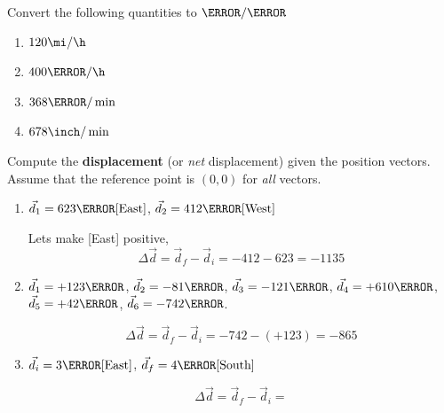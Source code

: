 \documentclass[12pt]{article} %
\newcommand{\tx}[1]{\text{#1}}
\begin{document}
\begin{qstn}[2] %
	Convert the following quantities to $\m / \s$
	\begin{enumerate}[label = (\alph*)]
		\item $120 \mi / \h$
		\vspace*{4cm}

		\item $400 \km / \h$
		\vspace*{4cm}
		
		\item $368 \m / \min$
		\vspace*{4cm}

		\item $678 \inch / \min$
		\vspace*{4cm}

	\end{enumerate}

\end{qstn}


\begin{qstn}[3]
	Compute the \textbf{displacement} (or \emph{net} displacement) given the position vectors. Assume that the reference point is $(0,0)$ for \emph{all} vectors.
    \begin{enumerate}[label=(\alph*)]
        \item $\vec d_1 = 623 \tx{\m}[\tx{East}]$, $\vec d_2 = 412 \tx{\m}[\tx{West}]$

        \begin{soln}
            Lets make [East] positive,
            $$\Delta \vec d = \vec d_f - \vec d_i = -412 - 623 = -1135$$

        \end{soln}




        \item $\vec d_1 = +123\km$, $\vec d_2 = -81\km$, $\vec d_3 = -121\km$, $\vec d_4 = +610\km$, $\vec d_5 = +42\km$, $\vec d_6 = -742\m$.

        \begin{soln}
            $$\Delta \vec d = \vec d_f - \vec d_i = -742 - (+123) = -865$$

        \end{soln}



        \item $\vec d_i = 3\tx{\m}[\tx{East}]$, $\vec d_f = 4\tx{\m}[\tx{South}]$

        \begin{soln}
            $$\Delta \vec d = \vec d_f - \vec d_i =  $$

        \end{soln}



    \end{enumerate}

\end{qstn}
\end{document}
